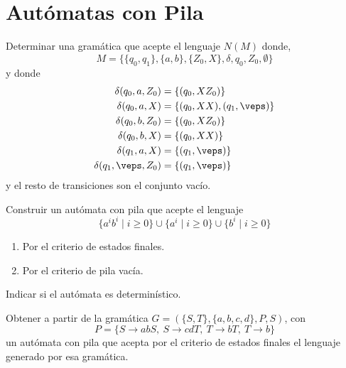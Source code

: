 \newpage
\section{Autómatas con Pila}

\begin{ejercicio}\label{ej:1.5.1}
    Determinar una gramática que acepte el lenguaje $N(M)$ donde,
    \begin{equation*}
        M = \{\{q_0, q_1\}, \{a,b\}, \{Z_0,X\},\delta,q_0,Z_0,\emptyset \}
    \end{equation*}
    y donde
    \begin{align*}
        \delta(q_0,a,Z_0) &= \{(q_0, XZ_0)\} \\
        \delta(q_0,a,X) &= \{(q_0, XX),(q_1,\veps)\} \\
        \delta(q_0,b,Z_0) &= \{(q_0, XZ_0)\} \\
        \delta(q_0,b,X) &= \{(q_0, XX)\} \\
        \delta(q_1,a,X) &= \{(q_1, \veps)\} \\
        \delta(q_1,\veps,Z_0) &= \{(q_1, \veps)\} 
    \end{align*}
    y el resto de  transiciones son el conjunto vacío.
\end{ejercicio}

\begin{ejercicio}\label{ej:1.5.2}
    Construir un autómata con pila que acepte el lenguaje
    \begin{equation*}
        \{a^ib^i \mid i\geq 0\} \cup \{a^i \mid i \geq 0\} \cup \{b^i \mid i \geq 0\}
    \end{equation*}
    \begin{enumerate}[label=\alph*)]
        \item Por el criterio de estados finales.
        \item Por el criterio de pila vacía.
    \end{enumerate}
    Indicar si el autómata es determinístico.
\end{ejercicio}

\begin{ejercicio}\label{ej:1.5.3}
    Obtener a partir de la gramática $G=(\{S,T\},\{a,b,c,d\},P,S)$, con
    \begin{equation*}
        P = \{S\rightarrow abS,\ S\rightarrow cdT,\ T\rightarrow bT,\ T\rightarrow b\}
    \end{equation*}
    un autómata con pila que acepta por el criterio de estados finales el lenguaje generado por esa gramática.
\end{ejercicio}

